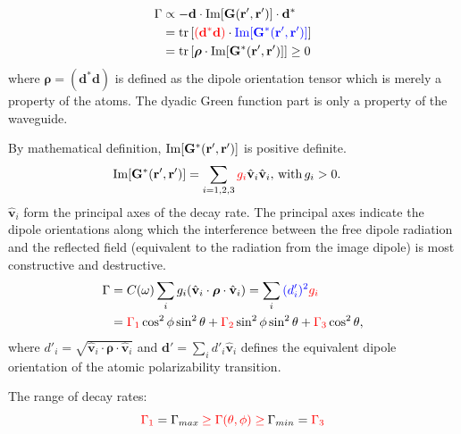 \documentclass[preprint,aps,pra,onecolumn]{revtex4-1} %
\begin{document}
\begin{align}
\Gamma &\propto -\mathbf{d}\cdot \mathrm{Im}[\mathbf{G}(\mathbf{r}',\mathbf{r}')]\cdot \mathbf{d}^* \\
&=\mathrm{tr}\left[ \mathbin{\color{red}{(\mathbf{d}^*\mathbf{d})}}\cdot\mathbin{\color{blue}{ \mathrm{Im}[\mathbf{G}^*(\mathbf{r}',\mathbf{r}')]}}  \right]\\
&= \mathrm{tr}\left[ \boldsymbol{\rho} \cdot \mathrm{Im}[\mathbf{G}^{*}(\mathbf{r}',\mathbf{r}')]  \right]\ge 0
\end{align}
where $\boldsymbol{\rho}=(\mathbf{d}^*\mathbf{d})$ is defined as the dipole orientation tensor which is merely a property of the atoms. The dyadic Green function part is only a property of the waveguide.  

By mathematical definition, $\mathrm{Im}[\mathbf{G}^{*}(\mathbf{r}',\mathbf{r}')]$ is positive definite. 
\begin{align}
\mathrm{Im}[\mathbf{G}^{*}(\mathbf{r}',\mathbf{r}')] &= \sum_{i=1,2,3} \mathbin{\color{red}{g_i}}\hat{\mathbf{v}}_i\hat{\mathbf{v}}_i,\,\text{with}\, g_i>0.
\end{align}
$\hat{\mathbf{v}}_i$ form the principal axes of the decay rate. The principal axes indicate the dipole orientations along which the interference between the free dipole radiation and the reflected field (equivalent to the radiation from the image dipole) is most constructive and destructive.   
\begin{align}
\Gamma &= C(\omega)\sum_i g_i(\hat{\mathbf{v}}_i\cdot \boldsymbol{\rho}\cdot \hat{\mathbf{v}}_i) 
= \sum_i \mathbin{\color{blue}{(d'_i)^2}} \mathbin{\color{red}{g_i}} \\
&= \mathbin{\color{red}{\Gamma_1}}\cos^2\phi\sin^2\theta+\mathbin{\color{red}{\Gamma_2}}\sin^2\phi\sin^2\theta+\mathbin{\color{red}{\Gamma_3}}\cos^2\theta,
\end{align}
where $ d'_i=\sqrt{\hat{\mathbf{v}}_i\cdot \boldsymbol{\rho}\cdot \hat{\mathbf{v}}_i}$ and $\mathbf{d}'=\sum_i d'_i\hat{\mathbf{v}}_i$ defines the equivalent dipole orientation of the atomic polarizability transition.

The range of decay rates:
$$\mathbin{\color{red}{\Gamma_1}}=\Gamma_{max}\mathbin{\color{red}{\ge \Gamma (\theta,\phi) \ge}} \Gamma_{min}=\mathbin{\color{red}{\Gamma_3}}$$
\end{document}
